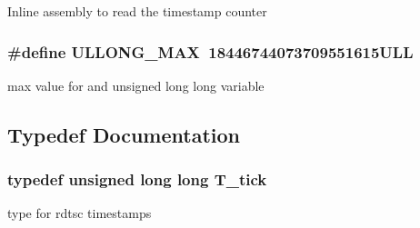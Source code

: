 Inline assembly to read the timestamp counter 
\subsubsection{\setlength{\rightskip}{0pt plus 5cm}\#define ULLONG\_\-MAX\ 18446744073709551615ULL}\label{rdtsc_8h_a0}


max value for and unsigned long long variable 

\subsection{Typedef Documentation}
\subsubsection{\setlength{\rightskip}{0pt plus 5cm}typedef unsigned long long T\_\-tick}\label{rdtsc_8h_a2}


type for rdtsc timestamps 